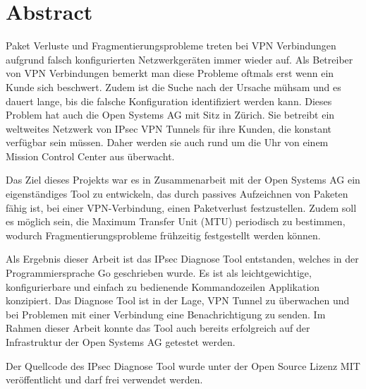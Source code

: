 
\chapter*{Abstract}

Paket Verluste und Fragmentierungsprobleme treten bei VPN Verbindungen aufgrund falsch konfigurierten Netzwerkgeräten immer wieder auf. Als Betreiber von VPN Verbindungen bemerkt man diese Probleme oftmals erst wenn ein Kunde sich beschwert. Zudem ist die Suche nach der Ursache mühsam und es dauert lange, bis die falsche Konfiguration identifiziert werden kann.
Dieses Problem hat auch die Open Systems AG mit Sitz in Zürich. Sie betreibt ein weltweites Netzwerk von IPsec VPN Tunnels für ihre Kunden, die konstant verfügbar sein müssen. Daher werden sie auch rund um die Uhr von einem Mission Control Center aus überwacht.

Das Ziel dieses Projekts war es in Zusammenarbeit mit der Open Systems AG ein eigenständiges Tool zu entwickeln, das durch passives Aufzeichnen von Paketen fähig ist, bei einer VPN-Verbindung, einen Paketverlust festzustellen.
Zudem soll es möglich sein, die Maximum Transfer Unit (MTU) periodisch zu bestimmen, wodurch Fragmentierungsprobleme frühzeitig festgestellt werden können.

Als Ergebnis dieser Arbeit ist das IPsec Diagnose Tool entstanden, welches in der Programmiersprache Go geschrieben wurde. Es ist als leichtgewichtige, konfigurierbare und einfach zu bedienende Kommandozeilen Applikation konzipiert. Das Diagnose Tool ist in der Lage, VPN Tunnel zu überwachen und bei Problemen mit einer Verbindung eine Benachrichtigung zu senden. Im Rahmen dieser Arbeit konnte das Tool auch bereits erfolgreich auf der Infrastruktur der Open Systems AG getestet werden.

Der Quellcode des IPsec Diagnose Tool wurde unter der Open Source Lizenz MIT veröffentlicht und darf frei verwendet werden.